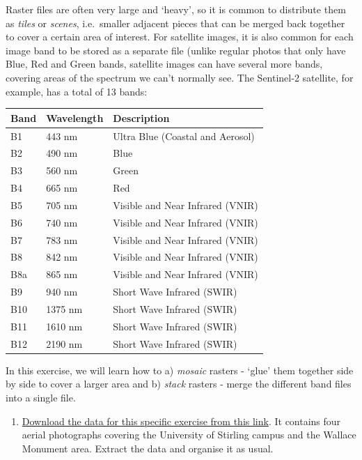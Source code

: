 \documentclass[
  letterpaper,
  DIV=11,
  numbers=noendperiod]{scrreprt}
\providecommand{\tightlist}{%
  \setlength{\itemsep}{0pt}\setlength{\parskip}{0pt}}\usepackage{longtable,booktabs,array}
\begin{document}
Raster files are often very large and `heavy', so it is common to
distribute them as \emph{tiles} or \emph{scenes}, i.e.~smaller adjacent
pieces that can be merged back together to cover a certain area of
interest. For satellite images, it is also common for each image band to
be stored as a separate file (unlike regular photos that only have Blue,
Red and Green bands, satellite images can have several more bands,
covering areas of the spectrum we can't normally see. The Sentinel-2
satellite, for example, has a total of 13 bands:

\begin{longtable}[]{@{}lll@{}}
\toprule\noalign{}
Band & Wavelength & Description \\
\midrule\noalign{}
\endhead
\bottomrule\noalign{}
\endlastfoot
B1 & 443 nm & Ultra Blue (Coastal and Aerosol) \\
B2 & 490 nm & Blue \\
B3 & 560 nm & Green \\
B4 & 665 nm & Red \\
B5 & 705 nm & Visible and Near Infrared (VNIR) \\
B6 & 740 nm & Visible and Near Infrared (VNIR) \\
B7 & 783 nm & Visible and Near Infrared (VNIR) \\
B8 & 842 nm & Visible and Near Infrared (VNIR) \\
B8a & 865 nm & Visible and Near Infrared (VNIR) \\
B9 & 940 nm & Short Wave Infrared (SWIR) \\
B10 & 1375 nm & Short Wave Infrared (SWIR) \\
B11 & 1610 nm & Short Wave Infrared (SWIR) \\
B12 & 2190 nm & Short Wave Infrared (SWIR) \\
\end{longtable}

In this exercise, we will learn how to a) \emph{mosaic} rasters - `glue'
them together side by side to cover a larger area and b) \emph{stack}
rasters - merge the different band files into a single file.

\begin{enumerate}
\def\labelenumi{(\arabic{enumi})}
\setcounter{enumi}{181}
\tightlist
\item
  \href{https://stir-my.sharepoint.com/:u:/g/personal/ala2_stir_ac_uk/EWWIMudbgUlImqIZ5ZYoVw4BNhL1rRn5swLLTvJnli2r_A?e=NIVOuW}{Download
  the data for this specific exercise from this link}. It contains four
  aerial photographs covering the University of Stirling campus and the
  Wallace Monument area. Extract the data and organise it as usual.
\end{enumerate}
\end{document}
